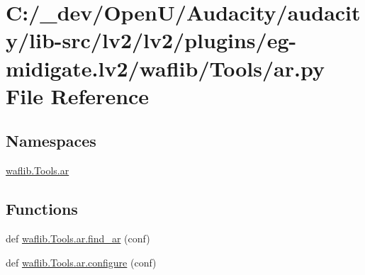 \hypertarget{lv2_2plugins_2eg-midigate_8lv2_2waflib_2_tools_2ar_8py}{}\section{C\+:/\+\_\+dev/\+Open\+U/\+Audacity/audacity/lib-\/src/lv2/lv2/plugins/eg-\/midigate.lv2/waflib/\+Tools/ar.py File Reference}
\label{lv2_2plugins_2eg-midigate_8lv2_2waflib_2_tools_2ar_8py}
\subsection*{Namespaces}
\begin{DoxyCompactItemize}
\item 
 \hyperlink{namespacewaflib_1_1_tools_1_1ar}{waflib.\+Tools.\+ar}
\end{DoxyCompactItemize}
\subsection*{Functions}
\begin{DoxyCompactItemize}
\item 
def \hyperlink{namespacewaflib_1_1_tools_1_1ar_ade578f6e88784a6a5524a2ff2333096b}{waflib.\+Tools.\+ar.\+find\+\_\+ar} (conf)
\item 
def \hyperlink{namespacewaflib_1_1_tools_1_1ar_adac714580d14727514e133de54b6c0b3}{waflib.\+Tools.\+ar.\+configure} (conf)
\end{DoxyCompactItemize}
